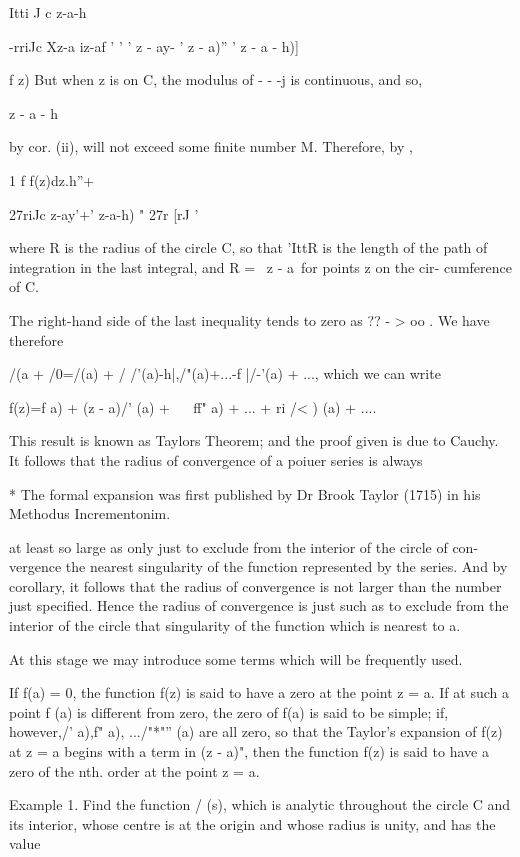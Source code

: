 {{    Itti J c z-a-h

 -rriJc Xz-a iz-af ' ' ' z - ay- ' z - a)'' ' z - a - h)]

f z) But when z is on C, the modulus of - - -j is continuous, and so,

z - a - h

by  cor. (ii), will not exceed some finite number M. Therefore,
by ,

1 f f(z)dz.h''+

27riJc z-ay'+' z-a-h) " 27r [rJ '

where R is the radius of the circle C, so that 'IttR is the length of
the path of integration in the last integral, and R = \ z - a\ for
points z on the cir- cumference of C.

The right-hand side of the last inequality tends to zero as ?? - > oo
. We have therefore

/(a + /0=/(a) + / /'(a)-h|,/"(a)+...-f |/-'(a) + ..., which we can
write

f(z)=f a) + (z - a)/' (a) + ~ ~ff" a) + ... + ri /< ) (a) + ....

This result is known as Taylors Theorem; and the proof given is due
to Cauchy. It follows that the radius of convergence of a poiuer
series is always

* The formal expansion was first published by Dr Brook Taylor (1715)
in his Methodus Incrementonim.

%
%

at least so large as only just to exclude from the interior of the
circle of con- vergence the nearest singularity of the function
represented by the series. And by  corollary, it follows that the
radius of convergence is not larger than the number just specified.
Hence the radius of convergence is just such as to exclude from the
interior of the circle that singularity of the function which is
nearest to a.

At this stage we may introduce some terms which will be frequently
used.

If f(a) = 0, the function f(z) is said to have a zero at the point z =
a. If at such a point f (a) is different from zero, the zero of f(a)
is said to be simple; if, however,/' a),f" a), .../"*"'' (a) are all
zero, so that the Taylor's expansion of f(z) at z = a begins with a
term in (z - a)", then the function f(z) is said to have a zero of the
nth. order at the point z = a.

Example 1. Find the function / (s), which is analytic throughout the
circle C and its interior, whose centre is at the origin and whose
radius is unity, and has the value

}}
